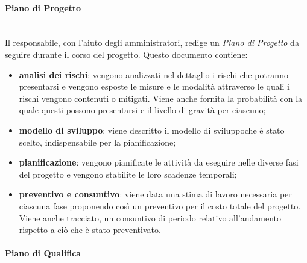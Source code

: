 \paragraph{Piano di Progetto} \mbox{}\\ 

\noindent Il responsabile, con l'aiuto degli amministratori, redige un \textit{Piano di 
Progetto} da seguire durante il corso del progetto. Questo documento contiene:
	\begin{itemize}
		\item \textbf{analisi dei rischi}: vengono analizzati nel dettaglio i rischi 
			che potranno presentarsi e vengono esposte le misure e le modalità attraverso le 
			quali i rischi vengono contenuti o mitigati. Viene anche fornita la probabilità 
			con la quale questi possono presentarsi e il livello di gravità per ciascuno;
		\item \textbf{modello di sviluppo\glo}: viene descritto il modello di 
			sviluppo\glosp che è stato scelto, indispensabile per la pianificazione;
		\item \textbf{pianificazione}: vengono pianificate le attività da eseguire 
			nelle diverse fasi del progetto e vengono stabilite le loro scadenze temporali;
		\item \textbf{preventivo e consuntivo}: viene data una stima di lavoro 
			necessaria per ciascuna fase proponendo così un preventivo per il costo totale 
			del progetto. Viene anche tracciato, un consuntivo di periodo relativo 
			all'andamento rispetto a ciò che è stato preventivato.
	\end{itemize}
		
\paragraph{Piano di Qualifica} \mbox{}\\

